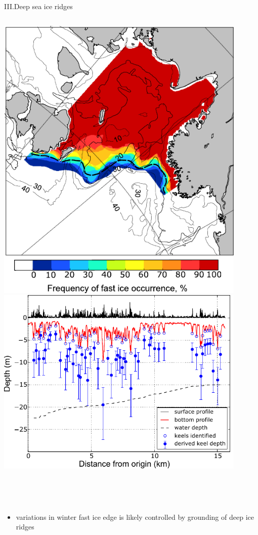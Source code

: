 \documentclass[8pt]{beamer}
\begin{document}
\setwatermark{\fontsize{125pt}{125pt}\selectfont{}}
\begin{frame}[fragile]{III.Deep sea ice ridges}
\begin{columns}
		\includegraphics[width=0.9\textwidth]{./img/Rgrth_freqency.pdf}
		\includegraphics[width=0.9\textwidth]{./img/EM_profile.pdf}
	\end{columns}\\~\\
\begin{itemize}
	\item variations in winter fast ice edge is likely controlled by grounding of deep ice ridges
\end{itemize}
\end{frame}
\end{document}
